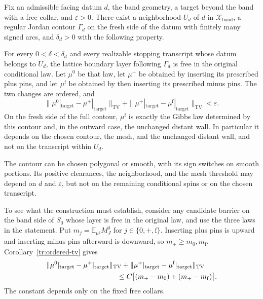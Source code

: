 \begin{lemma}\label{if:erosion}
Fix an admissible facing datum $d$, the band geometry, a target beyond
the band with a free collar, and $\varepsilon>0$.  There exist a
neighborhood $U_d$ of $d$ in $\mathcal X_{\mathrm{band}}$, a regular
Jordan contour $\Gamma_d$ on the fresh side of the datum with finitely
many signed arcs, and $\delta_d>0$ with the following property.

For every $0<\delta<\delta_d$ and every realizable stopping transcript
whose datum belongs to $U_d$, the lattice boundary layer following
$\Gamma_d$ is free in the original conditional law.  Let $\mu^0$ be
that law, let $\mu^+$ be obtained by inserting its prescribed plus
pins, and let $\mu^{\mathrm f}$ be obtained by then inserting its
prescribed minus pins.  The two changes are ordered, and
\begin{equation}\label{if:erosion-tv}
 \|\mu^0|_{\mathrm{target}}-\mu^+|_{\mathrm{target}}\|_{\mathrm{TV}}
 +\|\mu^+|_{\mathrm{target}}-\mu^{\mathrm f}|_{\mathrm{target}}\|_{\mathrm{TV}}
                   <\varepsilon.
\end{equation}
On the fresh side of the full contour, $\mu^{\mathrm f}$ is exactly
the Gibbs law determined by this contour and, in the outward case,
the unchanged distant wall.  In particular it depends on the chosen
contour, the mesh, and the unchanged distant wall, and not on the transcript within $U_d$.

The contour can be chosen polygonal or smooth, with its sign switches
on smooth portions.  Its positive clearances, the neighborhood, and
the mesh threshold may depend on $d$ and $\varepsilon$, but not on
the remaining conditional spins or on the chosen transcript.
\end{lemma}

To see what the construction must establish, consider any candidate
barrier on the band side of $S_0$ whose layer is free in the original
law, and use the three laws in the statement. Put $m_j=\mathbb E_{\mu^j}M_J^\delta$ for
$j\in\{0,+,\mathrm f\}$. Inserting plus pins is upward and inserting
minus pins afterward is downward, so $m_+\ge m_0,m_{\mathrm f}$.
Corollary~\ref{tr:ordered-tv} gives
\begin{equation}\label{if:erosion-mean-reduction}
\begin{split}
 &\|\mu^0|_{\mathrm{target}}-\mu^+|_{\mathrm{target}}\|_{\mathrm{TV}}
 +\|\mu^+|_{\mathrm{target}}-\mu^{\mathrm f}|_{\mathrm{target}}\|_{\mathrm{TV}}\\
 &\hspace{35mm}\le C\bigl[(m_+-m_0)+(m_+-m_{\mathrm f})\bigr].
\end{split}
\end{equation}
The constant depends only on the fixed free collars.

